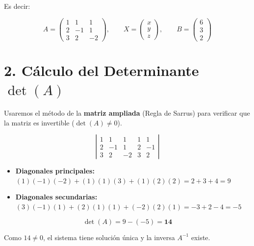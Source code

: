 \documentclass{article}
\begin{document}
	\bigskip
	
	\noindent Es decir:
	
	\[
	A = \begin{pmatrix} 1 & 1 & 1 \\ 2 & -1 & 1 \\ 3 & 2 & -2 \end{pmatrix},
	\qquad
	X = \begin{pmatrix} x \\ y \\ z \end{pmatrix},
	\qquad
	B = \begin{pmatrix} 6 \\ 3 \\ 2 \end{pmatrix}
	\]
	
	\newpage
	
	
	\section*{2. Cálculo del Determinante $\det(A)$}
	
	Usaremos el método de la \textbf{matriz ampliada} (Regla de Sarrus) para verificar que la matriz es
	invertible ($\det(A) \neq 0$).
	
	\bigskip
	
	\[
	\left|
	\begin{array}{ccc|cc}
		1 &  1 &  1 & 1 &  1 \\
		2 & -1 &  1 & 2 & -1 \\
		3 &  2 & -2 & 3 &  2
	\end{array}
	\right|
	\]
	
	\bigskip
	
	\begin{itemize}
		\item \textbf{Diagonales principales:}
		$(1)(-1)(-2) + (1)(1)(3) + (1)(2)(2) = 2 + 3 + 4 = 9$
		
		\item \textbf{Diagonales secundarias:}
		$(3)(-1)(1) + (2)(1)(1) + (-2)(2)(1) = -3 + 2 - 4 = -5$
	\end{itemize}
	
	\bigskip
	
	\[
	\det(A) = 9 - (-5) = \mathbf{14}
	\]
	
	\bigskip
	
	\noindent Como $14 \neq 0$, el sistema tiene solución única y la inversa $A^{-1}$ existe.
	
\end{document}
